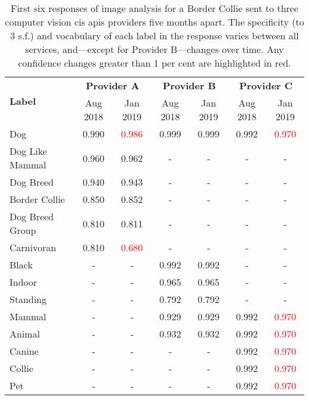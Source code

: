 \begin{table}[b!]
  \centering
  \caption[Varying confidence changes over time between 3 CV APIs]{First six responses of image analysis for a Border Collie sent to three computer vision \gls{cis} \glspl{api} providers five months apart. The specificity (to 3 s.f.) and vocabulary of each label in the response varies between all services, and---except for Provider B---changes over time. Any confidence changes greater than 1 per cent are highlighted in red.}
  \label{tab:introduction:motivation:scenario:pam:confchanges}
  \begin{tabular}{l|c|c|c|c|c|c}
    \toprule
    \multirow{2}{*}{\bfseries Label} &
    \multicolumn{2}{c}{\bfseries Provider A} &
    \multicolumn{2}{c}{\bfseries Provider B} &
    \multicolumn{2}{c}{\bfseries Provider C} \\
    &
    Aug 2018 & Jan 2019 &
    Aug 2018 & Jan 2019 &
    Aug 2018 & Jan 2019 \\
    \midrule
    Dog             & 0.990 & \textcolor{red}{0.986} & 0.999 & 0.999 & 0.992 & \textcolor{red}{0.970} \\
    Dog Like Mammal & 0.960 & 0.962 & -     & -     & -     & -     \\
    Dog Breed       & 0.940 & 0.943 & -     & -     & -     & -     \\
    Border Collie   & 0.850 & 0.852 & -     & -     & -     & -     \\
    Dog Breed Group & 0.810	& 0.811 & -     & -     & -     & -     \\
    Carnivoran      & 0.810 & \textcolor{red}{0.680} & -     & -     & -     & -     \\
    Black           & -     & -     & 0.992 & 0.992 & -     & -     \\
    Indoor          & -     & -     & 0.965 & 0.965 & -     & -     \\
    Standing        & -     & -     & 0.792 & 0.792 & -     & -     \\
    Mammal          & -     & -     & 0.929 & 0.929 & 0.992 & \textcolor{red}{0.970} \\
    Animal          & -     & -     & 0.932 & 0.932 & 0.992 & \textcolor{red}{0.970} \\
    Canine          & -     & -     & -     & -     & 0.992 & \textcolor{red}{0.970} \\
    Collie          & -     & -     & -     & -     & 0.992 & \textcolor{red}{0.970} \\
    Pet             & -     & -     & -     & -     & 0.992 & \textcolor{red}{0.970} \\
    \bottomrule
  \end{tabular}
\end{table}